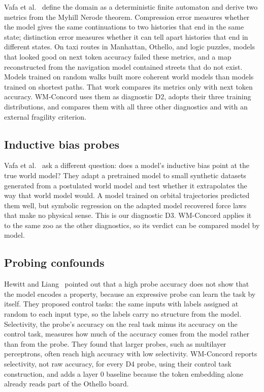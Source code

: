 \documentclass[11pt]{scrartcl}
\begin{document}
Vafa et al.~\cite{vafa2024evaluating} define the domain as a deterministic finite automaton and derive two
metrics from the Myhill Nerode theorem. Compression error measures whether the model gives the same
continuations to two histories that end in the same state; distinction error measures whether it can tell
apart histories that end in different states. On taxi routes in Manhattan, Othello, and logic puzzles, models
that looked good on next token accuracy failed these metrics, and a map reconstructed from the navigation
model contained streets that do not exist. Models trained on random walks built more coherent world models
than models trained on shortest paths. That work compares its metrics only with next token accuracy.
WM-Concord uses them as diagnostic D2, adopts their three training distributions, and compares them with all
three other diagnostics and with an external fragility criterion.

\subsection{Inductive bias probes}

Vafa et al.~\cite{vafa2025inductive} ask a different question: does a model's inductive bias point at the
true world model? They adapt a pretrained model to small synthetic datasets generated from a postulated world
model and test whether it extrapolates the way that world model would. A model trained on orbital
trajectories predicted them well, but symbolic regression on the adapted model recovered force laws that make
no physical sense. This is our diagnostic D3. WM-Concord applies it to the same zoo as the other diagnostics,
so its verdict can be compared model by model.

\subsection{Probing confounds}

Hewitt and Liang~\cite{hewitt2019control} pointed out that a high probe accuracy does not show that the
model encodes a property, because an expressive probe can learn the task by itself. They proposed control
tasks: the same inputs with labels assigned at random to each input type, so the labels carry no structure
from the model. Selectivity, the probe's accuracy on the real task minus its accuracy on the control task,
measures how much of the accuracy comes from the model rather than from the probe. They found that larger
probes, such as multilayer perceptrons, often reach high accuracy with low selectivity. WM-Concord reports
selectivity, not raw accuracy, for every D4 probe, using their control task construction, and adds a layer 0
baseline because the token embedding alone already reads part of the Othello board.
\end{document}
